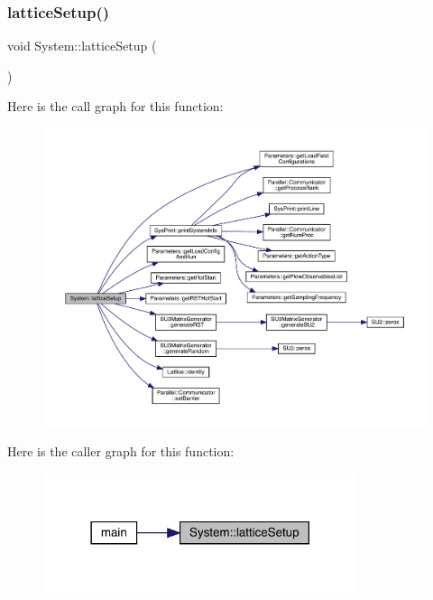 \subsubsection{\texorpdfstring{latticeSetup()}{latticeSetup()}}
{\footnotesize\ttfamily void System\+::lattice\+Setup (\begin{DoxyParamCaption}{ }\end{DoxyParamCaption})}

Here is the call graph for this function\+:
\nopagebreak
\begin{figure}[H]
\begin{center}
\leavevmode
\includegraphics[width=350pt]{class_system_a93c8a8258ac8f6382ec393bca1271011_cgraph}
\end{center}
\end{figure}
Here is the caller graph for this function\+:
\nopagebreak
\begin{figure}[H]
\begin{center}
\leavevmode
\includegraphics[width=261pt]{class_system_a93c8a8258ac8f6382ec393bca1271011_icgraph}
\end{center}
\end{figure}
\mbox{\label{class_system_afa39feb75f96798930f4bfb48205f40b}} 
